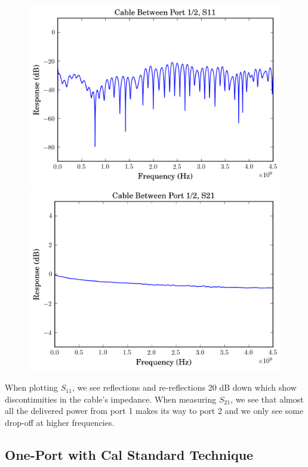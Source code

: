 \documentclass[11pt]{article}
\begin{document}
\begin{figure}[H]
	\includegraphics[width=\linewidth]{images/cable_phase_s11.png}
	\endminipage\hfill
	\includegraphics[width=\linewidth]{images/cable_phase_s21.png}
	\endminipage
\end{figure}

When plotting $S_{11}$, we see reflections and re-reflections 20 dB down which show discontinuities in the cable's impedance. When measuring $S_{21}$, we see that almost all the delivered power from port 1 makes its way to port 2 and we only see some drop-off at higher frequencies.

\subsection{One-Port with Cal Standard Technique}
\end{document}
